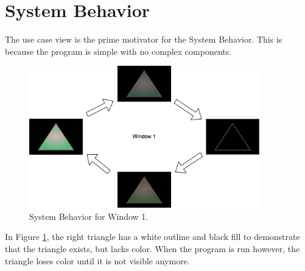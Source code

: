 \section{System Behavior}

The use case view is the prime motivator for the System Behavior.
This is because the program is simple with no complex components.

\begin{figure}[htb]
    \centering
    \includegraphics[width=10cm]{./Images/SysBehavior.png}
       \caption{System Behavior for Window 1.}
           \label{Fig:Fig1}
\end{figure}

In Figure \ref{Fig:Fig1}, the right triangle has a white outline and black fill to demonstrate that the triangle exists, but lacks color.
When the program is run however, the triangle loses color until it is not visible anymore.